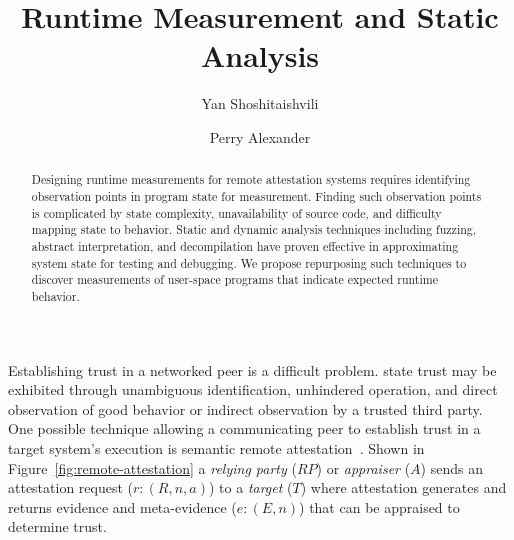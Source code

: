 \documentclass[runningheads]{llncs}
\begin{document}
%
\title{Runtime Measurement and Static Analysis}
%
%
\author{Yan Shoshitaishvili \and Perry Alexander}
%
%
%
\maketitle              %
%
\begin{abstract}
  Designing runtime measurements for remote attestation systems
  requires identifying observation points in program state for
  measurement.  Finding such observation points is complicated by
  state complexity, unavailability of source code, and difficulty
  mapping state to behavior.  Static and dynamic analysis techniques
  including fuzzing, abstract interpretation, and decompilation have
  proven effective in approximating system state for testing and
  debugging.  We propose repurposing such techniques to discover
  measurements of user-space programs that indicate expected runtime
  behavior.
  
  
\end{abstract}
%
%
%


Establishing trust in a networked peer is a difficult problem. \citet{Martin:08:The-ten-page-in} state trust may be exhibited through unambiguous identification, unhindered operation, and direct observation of good behavior or indirect observation by a trusted third party. One possible technique allowing a communicating peer to establish trust in a target system's execution is semantic remote attestation~\citep{Haldar:04:Semantic-Remote}. Shown in Figure~\ref{fig:remote-attestation} a \emph{relying party} ($RP$) or \emph{appraiser} ($A$) sends an attestation request ($r:(R,n,a)$) to a \emph{target} ($T$) where attestation generates and returns evidence
and meta-evidence ($e:(E,n)$) that can be appraised to determine
trust. 
\end{document}
